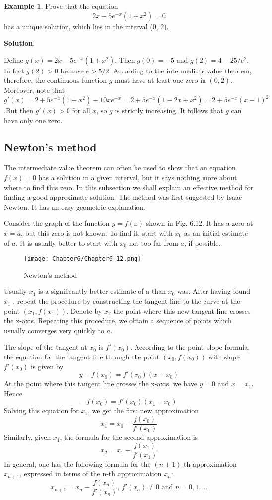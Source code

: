 \documentclass[10pt,a4paper]{book}
\theoremstyle{definition}\newtheorem{definition}{Definition}
\theoremstyle{definition}\newtheorem{fact}{Fact}
\theoremstyle{definition}\newtheorem{ex}{Ex.}
\theoremstyle{definition}\newtheorem{project}{Project}
\theoremstyle{definition}\newtheorem{problem}{Problem}
\theoremstyle{definition}\newtheorem{example}{Example}
\numberwithin{theorem}{chapter}
\numberwithin{corollary}{chapter}
\numberwithin{assumption}{chapter}
\numberwithin{definition}{chapter}
\numberwithin{prop}{chapter}
\numberwithin{notation}{chapter}
\numberwithin{problem}{chapter}
\numberwithin{example}{chapter}
\numberwithin{fact}{chapter}
\numberwithin{ex}{chapter}
\begin{document}
	\begin{example}
		Prove that the equation
		$$2x - 5e^{-x}(1+x^2)=0$$
		has a unique solution, which lies in the interval (0, 2).
		
		\textbf{Solution}:
		
		Define $g(x) = 2x - 5e^{-x}(1 + x^2)$. Then $g(0) = -5$ and $g(2) = 4 - 25/e^2$. In fact $g(2) > 0$ because $e > 5/2$. According to the intermediate value theorem, therefore, the continuous function $g$ must have at least one zero in $(0, 2)$. Moreover, note that $g'(x) = 2 + 5e^{-x}(1+x^2)-10xe^{-x} =2+5e^{-x}(1-2x+x^2)=2+5e^{-x}(x-1)^2$.But then $g'(x)>0$ for all $x$, so $g$ is strictly increasing. It follows that $g$ can have only one zero.
	\end{example}
	
	\subsection{Newton's method}
	
	The intermediate value theorem can often be used to show that an equation $f (x) = 0$ has a solution in a given interval, but it says nothing more about where to find this zero. In this subsection we shall explain an effective method for finding a good approximate solution. The method was first suggested by Isaac Newton. It has an easy geometric explanation.
	
	Consider the graph of the function $y = f (x)$ shown in Fig. 6.12. It has a zero at $x = a$, but this zero is not known. To find it, start with $x_0$ as an initial estimate of $a$. It is usually better to start with $x_0$ not too far from $a$, if possible.
	\begin{figure}[H]
		\centering
		\texttt{[image: Chapter6/Chapter6\_12.png]}
		\caption{Newton's method}
	\end{figure}
	Usually $x_1$ is a significantly better estimate of a than $x_0$ was. After having found $x_1$ , repeat the procedure by constructing the tangent line to the curve at the point $(x_1, f(x_1))$. Denote by $x_2$ the point where this new tangent line crosses the x-axis. Repeating this procedure, we obtain a sequence of points which usually converges very quickly to $a$.
	
	The slope of the tangent at $x_0$ is $f'(x_0)$. According to the point–slope formula, the equation for the tangent line through the point $(x_0, f(x_0))$ with slope $f'(x_0)$ is given by
	$$y - f(x_0) = f'(x_0)(x - x_0)$$
	At the point where this tangent line crosses the x-axis, we have $y = 0$ and $x = x_1$. Hence
	$$-f(x_0) = f'(x_0)(x_1 - x_0)$$ 
	Solving this equation for $x_1$, we get the first new approximation
	$$x_1 = x_0 - \frac{f(x_0)}{f'(x_0)}$$
	Similarly, given $x_1$, the formula for the second approximation is
	$$x_2 = x_1 - \frac{f(x_1)}{f'(x_1)}$$
	In general, one has the following formula for the $(n + 1)$-th approximation $x_{n+1}$, expressed in terms of the n-th approximation $x_n$:
	$$x_{n+1} = x_n - \frac{f(x_n)}{f'(x_n)} \text{,   }f'(x_n) \neq 0 \text{ and } n=0,1,\dots$$
	
\end{document}

